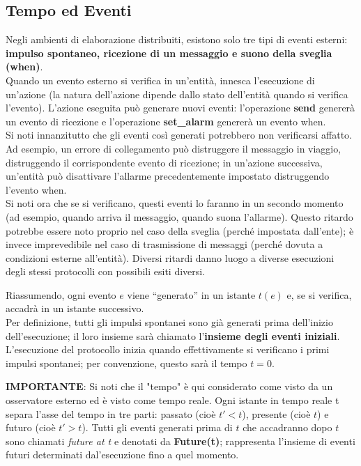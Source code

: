 \subsection{Tempo ed Eventi}
Negli ambienti di elaborazione distribuiti, esistono solo tre tipi di eventi esterni: \textbf{impulso spontaneo, ricezione di un messaggio e suono della sveglia (when)}.\\
Quando un evento esterno si verifica in un'entità, innesca l'esecuzione di un'azione (la natura dell'azione dipende dallo stato dell'entità quando si verifica l'evento). L'azione eseguita può generare nuovi eventi: l'operazione \textbf{send} genererà un evento di ricezione e l'operazione \textbf{set\_alarm} genererà un evento when.\\
Si noti innanzitutto che gli eventi così generati potrebbero non verificarsi affatto. Ad esempio, un errore di collegamento può distruggere il messaggio in viaggio, distruggendo il corrispondente evento di ricezione; in un'azione successiva, un'entità può disattivare l'allarme precedentemente impostato distruggendo l'evento when.\\
Si noti ora che se si verificano, questi eventi lo faranno in un secondo momento (ad esempio, quando arriva il messaggio, quando suona l'allarme). Questo ritardo potrebbe essere noto proprio nel caso della sveglia (perché impostata dall'ente); è invece imprevedibile nel caso di trasmissione di messaggi (perché dovuta a condizioni esterne all'entità). Diversi ritardi danno luogo a diverse esecuzioni degli stessi protocolli con possibili esiti diversi.

Riassumendo, ogni evento $e$ viene “generato” in un istante $t(e)$ e, se si verifica, accadrà in un istante successivo.\\
Per definizione, tutti gli impulsi spontanei sono già generati prima dell'inizio dell'esecuzione; il loro insieme sarà chiamato l'\textbf{insieme degli eventi iniziali}. L'esecuzione del protocollo inizia quando effettivamente si verificano i primi impulsi spontanei; per convenzione, questo sarà il tempo $t = 0$.

\textbf{IMPORTANTE}: Si noti che il "tempo" è qui considerato come visto da un osservatore esterno ed è visto come tempo reale. Ogni istante in tempo reale t separa l'asse del tempo in tre parti: passato (cioè {$t' < t$}), presente (cioè $t$) e futuro (cioè {$t' > t$}). Tutti gli eventi generati prima di $t$ che accadranno dopo $t$ sono chiamati \textit{future at t} e denotati da \textbf{Future(t)}; rappresenta l'insieme di eventi futuri determinati dal'esecuzione fino a quel momento.

